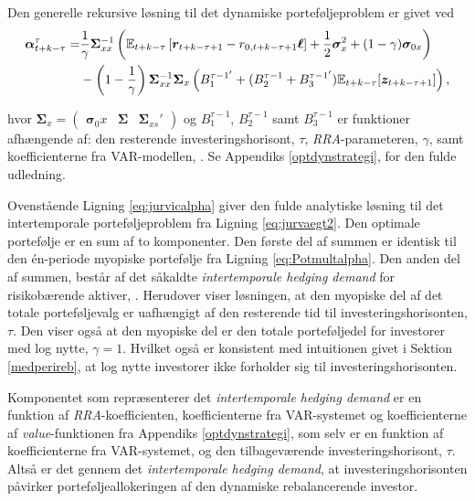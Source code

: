 \documentclass[
  a4paper,
  oneside]{memoir}
\begin{document}
Den generelle rekursive løsning til det dynamiske porteføljeproblem er givet ved
\begin{align}
\bm{\alpha}_{t+k-\tau}^\tau = &\frac{1}{\gamma} \bm{\Sigma}_{xx}^{-1} \left( \mathbb{E}_{t+k-\tau} \left[ \bm{r}_{t+k-\tau+1} - r_{0,t+k-\tau+1} \bm{\ell} \right] + \frac{1}{2} \bm{\sigma}_x^2 + (1-\gamma) \bm{\sigma}_{0x} \right) \notag\\
&- \left(1-\frac{1}{\gamma} \right) \bm{\Sigma}_{xx}^{-1} \bm{\Sigma}_x \left(B_1^{\tau-1'}+(B_2^{\tau-1}+B_3^{\tau-1'})\mathbb{E}_{t+k-\tau}[\bm{z}_{t+k-\tau+1}]\right),\label{eq:jurvicalpha}
\end{align}

hvor \(\bm{\Sigma}_x=\begin{pmatrix}\bm{\sigma}_0x & \bm{\Sigma} & \bm{\Sigma}_{xs}'\end{pmatrix}\) og \(B_1^{\tau-1}\), \(B_2^{\tau-1}\) samt \(B_3^{\tau-1}\) er funktioner afhængende af: den resterende investeringshorisont, \(\tau\), \emph{RRA}-parameteren, \(\gamma\), samt koefficienterne fra VAR-modellen, \citep{JurVic2011}. Se Appendiks \ref{optdynstrategi}, for den fulde udledning.

Ovenstående Ligning \eqref{eq:jurvicalpha} giver den fulde analytiske løsning til det intertemporale porteføljeproblem fra Ligning \eqref{eq:jurvaegt2}. Den optimale portefølje er en sum af to komponenter. Den første del af summen er identisk til den én-periode myopiske portefølje fra Ligning \eqref{eq:Potmultalpha}. Den anden del af summen, består af det såkaldte \emph{intertemporale hedging demand} for risikobærende aktiver, \citep{Merton1969, Merton1971, Merton1973}. Herudover viser løsningen, at den myopiske del af det totale porteføljevalg er uafhængigt af den resterende tid til investeringshorisonten, \(\tau\). Den viser også at den myopiske del er den totale porteføljedel for investorer med log nytte, \(\gamma=1\). Hvilket også er konsistent med intuitionen givet i Sektion \ref{medperireb}, at log nytte investorer ikke forholder sig til investeringshorisonten.

Komponentet som repræsenterer det \emph{intertemporale hedging demand} er en funktion af \emph{RRA}-koefficienten, koefficienterne fra VAR-systemet og koefficienterne af \emph{value}-funktionen fra Appendiks \ref{optdynstrategi}, som selv er en funktion af koefficienterne fra VAR-systemet, og den tilbageværende investeringshorisont, \(\tau\). Altså er det gennem det \emph{intertemporale hedging demand}, at investeringshorisonten påvirker porteføljeallokeringen af den dynamiske rebalancerende investor.
\end{document}
